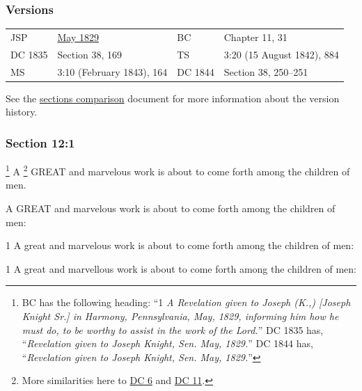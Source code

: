 	\subsubsection{Versions}
		\label{DC12-V}
	
		\begin{tabular}{p{1in}p{2in}p{1in}p{2in}}
			JSP		& \hyperref[EMS-1828-1829-JS-MAY-1829-B]{May 1829}	& BC & Chapter 11, 31 \\
			DC 1835	& Section 38, 169									& TS & 3:20 (15 August 1842), 884 \\
			MS		& 3:10 (February 1843), 164							& DC 1844 & Section 38, 250--251 \\
		\end{tabular}
		
		\medskip
		
		See the \href{https://drive.google.com/file/d/1goAvNz8jS4R8slYfMG_db55Ty2z_vmgK/view?usp=sharing}{sections comparison} document for more information about the version history.

	\subsubsection{Section 12:1} %
		\label{DC12-1}

			\footnote{%
				BC has the following heading: ``1 \textit{A Revelation given to Joseph (K.,) [Joseph Knight Sr.] in Harmony, Pennsylvania, May, 1829, informing him how he must do, to be worthy to assist in the work of the Lord.}'' DC 1835 has, ``\textit{Revelation given to Joseph Knight, Sen. May, 1829.}'' DC 1844 has, ``\textit{Revelation given to Joseph Knight, Sen. May, 1829.}''
				}%
		A%
			\footnote{%
				More similarities here to \hyperref[DC6]{DC 6} and \hyperref[DC11]{DC 11}.
				}
		GREAT and marvelous work is about to come forth among the children of men.

		\begin{framed}
		\scriptsize
			\begin{compactdesc}
				\item[JSP] A GREAT and marvelous work is about to come forth among the children of men:
				\item[DC 1835] 1 A great and marvelous work is about to come forth among the children of men: 
				\item[DC 1844] 1 A great and marvellous work is about to come forth among the children of men: 
			\end{compactdesc}
		\end{framed}

